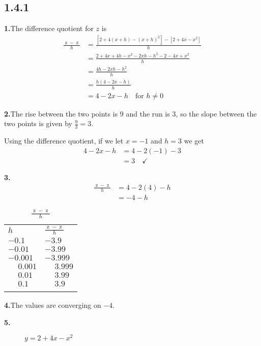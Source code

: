 \documentclass[12pt,]{book}
\theoremstyle{plain}
\theoremstyle{definition}
\numberwithin{equation}{section}
\newcommand{\hrulemedium}{\noalign{\hrule height 0.07em}}
\newcommand{\hrulethick} {\noalign{\hrule height 0.11em}}
\newcommand{\fe}[2]{\mathop{{#1}{\left(#2\right)}}}
\begin{document}
\subsection*{1.4.1 }
\noindent\textbf{1.}\quad{}The difference quotient for \(z\) is \begin{align*}
\frac{\fe{z}{x+h}-\fe{z}{x}}{h}&=\frac{\left[2+4(x+h)-(x+h)^2\right]-\left[2+4x-x^2\right]}{h}\\
&=\frac{2+4x+4h-x^2-2xh-h^2-2-4x+x^2}{h}\\
&=\frac{4h-2xh-h^2}{h}\\
&=\frac{h(4-2x-h)}{h}\\
&=4-2x-h\quad\text{for $h\neq0$}
\end{align*}%
\par\smallskip
\noindent\textbf{2.}\quad{}The rise between the two points is \(9\) and the run is \(3\), so the slope between the two points is given by \(\frac{9}{3}=3\).%
\par
Using the difference quotient, if we let \(x=-1\) and \(h=3\) we get\begin{align*}
4-2x-h&=4-2(-1)-3\\
&=3\quad\checkmark
\end{align*}%
\par\smallskip
\noindent\textbf{3.}\quad{}\begin{align*}
\frac{\fe{z}{4+h}-\fe{z}{4}}{h}&=4-2(4)-h\\
&=-4-h
\end{align*}%
\begin{table}
\centering
\caption{\(\frac{\fe{z}{4+h}-\fe{z}{4}}{h}\)\label{table-5}}
\begin{tabular}{ll}\hrulethick
\(h\)&\(\frac{\fe{z}{4+h}-\fe{z}{4}}{h}\)\\\hrulemedium
\(-0.1\)&\(-3.9\)\\
\(-0.01\)&\(-3.99\)\\
\(-0.001\)&\(-3.999\)\\
\(\phantom{-}0.001\)&\(\phantom{-}3.999\)\\
\(\phantom{-}0.01\)&\(\phantom{-}3.99\)\\
\(\phantom{-}0.1\)&\(\phantom{-}3.9\)\\\hrulethick
\end{tabular}
\end{table}
\par\smallskip
\noindent\textbf{4.}\quad{}The values are converging on \(-4\).%
\par\smallskip
\noindent\textbf{5.}\quad{}\begin{figure}
\centering
{
}
\caption{\(y=2+4x-x^2\)\label{figure-4}}
\end{figure}
\end{document}
